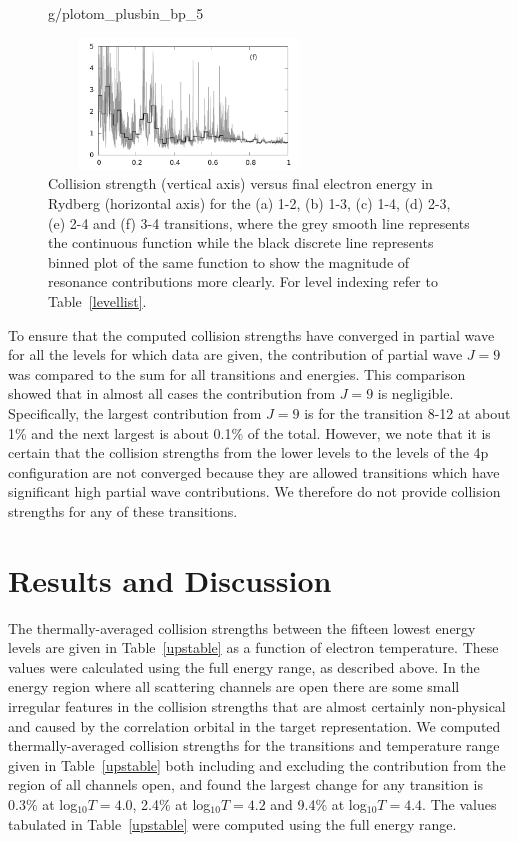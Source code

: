 \documentclass[useAMS,usenatbib]{mn2e}
\begin{document}
\begin{figure}
{\begin{minipage}[]{0.5\textwidth}
{g/plotom_plusbin_bp_5}
\end{minipage}}
%
\centering %
{\begin{minipage}[]{0.5\textwidth} \centering \includegraphics[height=3.5cm, width=7.5cm]
{g/plotom_plusbin_bp_6}
\end{minipage}}
%
\caption{Collision strength (vertical axis) versus final electron energy in Rydberg (horizontal
axis) for the (a) 1-2, (b) 1-3, (c) 1-4, (d) 2-3, (e) 2-4 and (f) 3-4 transitions, where the grey
smooth line represents the continuous function while the black discrete line represents binned plot
of the same function to show the magnitude of resonance contributions more clearly. For level
indexing refer to Table~\ref{levellist}. \label{plotOmega}}
\end{figure}

To ensure that the computed collision strengths have converged in partial wave for all the levels
for which data are given, the contribution of partial wave $J=9$ was compared to the sum for all
transitions and energies. This comparison showed that in almost all cases the contribution from
$J=9$ is negligible. Specifically, the largest contribution from $J=9$ is for the transition 8-12
at about 1\% and the next largest is about 0.1\% of the total. However, we note that it is certain
that the collision strengths from the lower levels to the levels of the 4p configuration are not
converged because they are allowed transitions which have significant high partial wave
contributions. We therefore do not provide collision strengths for any of these transitions.

\section{Results and Discussion} \label{Results}

The thermally-averaged collision strengths between the fifteen lowest energy levels are given in
Table~\ref{upstable} as a function of electron temperature. These values were calculated using the
full energy range, as described above. In the energy region where all scattering channels are open
there are some small irregular features in the collision strengths that are almost certainly
non-physical and caused by the correlation orbital in the target representation. We computed
thermally-averaged collision strengths for the transitions and temperature range given in
Table~\ref{upstable} both including and excluding the contribution from the region of all channels
open, and found the largest change for any transition is 0.3\% at log$_{10}T=4.0$, 2.4\% at
log$_{10}T=4.2$ and 9.4\% at log$_{10}T=4.4$. The values tabulated in Table~\ref{upstable} were
computed using the full energy range.
\end{document}
